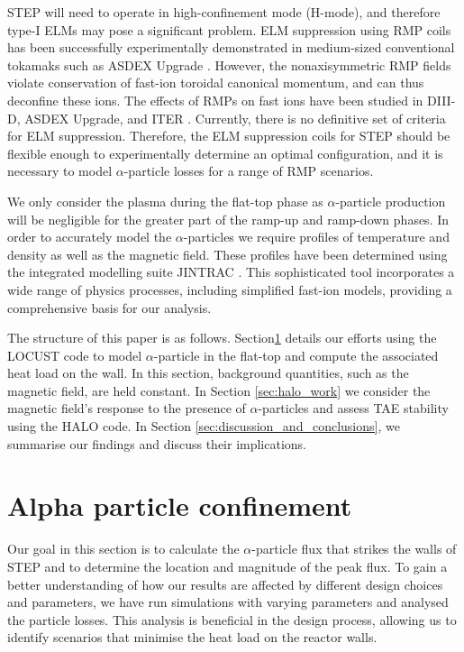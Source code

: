 \documentclass[10pt, a4paper, twoside]{article}
\begin{document}
STEP will need to operate in high-confinement mode (H-mode), and therefore type-I ELMs may pose a significant problem. ELM suppression using RMP coils has been successfully experimentally demonstrated in medium-sized conventional tokamaks such as ASDEX Upgrade \cite{suttrop2018}. However, the nonaxisymmetric RMP fields violate conservation of fast-ion toroidal canonical momentum, and can thus deconfine these ions. The effects of RMPs on fast ions have been studied in DIII-D, ASDEX Upgrade, and ITER \cite{van2015,sanchis2018,ward2022}. Currently, there is no definitive set of criteria for ELM suppression. Therefore, the ELM suppression coils for STEP should be flexible enough to experimentally determine an optimal configuration, and it is necessary to model $\alpha$-particle losses for a range of RMP scenarios.

We only consider the plasma during the flat-top phase as $\alpha$-particle production will be negligible for the greater part of the ramp-up and ramp-down phases. In order to accurately model the $\alpha$-particles we require profiles of temperature and density as well as the magnetic field. These profiles have been determined using the integrated modelling suite JINTRAC \cite{meyer2023, mitchell2023}. This sophisticated tool incorporates a wide range of physics processes, including simplified fast-ion models, providing a comprehensive basis for our analysis.

The structure of this paper is as follows. Section\ref{sec:locust_work} details our efforts using the LOCUST code to model $\alpha$-particle in the flat-top and compute the associated heat load on the wall. In this section, background quantities, such as the magnetic field, are held constant. In Section \ref{sec:halo_work} we consider the magnetic field's response to the presence of $\alpha$-particles and assess TAE stability using the HALO code. In Section \ref{sec:discussion_and_conclusions}, we summarise our findings and discuss their implications.

\section{Alpha particle confinement}
\label{sec:locust_work}

Our goal in this section is to calculate the $\alpha$-particle flux that strikes the walls of STEP and to determine the location and magnitude of the peak flux. To gain a better understanding of how our results are affected by different design choices and parameters, we have run simulations with varying parameters and analysed the particle losses. This analysis is beneficial in the design process, allowing us to identify scenarios that minimise the heat load on the reactor walls.
\end{document}
